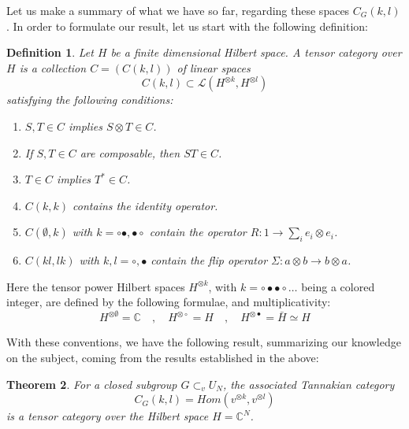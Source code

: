 \documentclass[12pt]{amsbook}
\newtheorem{theorem}{Theorem}[chapter]
\newtheorem{definition}[theorem]{Definition}
\begin{document}
Let us make a summary of what we have so far, regarding these spaces $C_G(k,l)$. In order to formulate our result, let us start with the following definition:


\begin{definition}
Let $H$ be a finite dimensional Hilbert space. A tensor category over $H$ is a collection $C=(C(k,l))$ of linear spaces 
$$C(k,l)\subset\mathcal L(H^{\otimes k},H^{\otimes l})$$
satisfying the following conditions:
\begin{enumerate}
\item $S,T\in C$ implies $S\otimes T\in C$.

\item If $S,T\in C$ are composable, then $ST\in C$.

\item $T\in C$ implies $T^*\in C$.

\item $C(k,k)$ contains the identity operator.

\item $C(\emptyset,k)$ with $k=\circ\bullet,\bullet\circ$ contain the operator $R:1\to\sum_ie_i\otimes e_i$.

\item $C(kl,lk)$ with $k,l=\circ,\bullet$ contain the flip operator $\Sigma:a\otimes b\to b\otimes a$.
\end{enumerate}
\end{definition}

Here the tensor power Hilbert spaces $H^{\otimes k}$, with $k=\circ\bullet\bullet\circ\ldots$ being a colored integer, are defined by the following formulae, and multiplicativity:
$$H^{\otimes\emptyset}=\mathbb C\quad,\quad
H^{\otimes\circ}=H\quad,\quad
H^{\otimes\bullet}=\bar{H}\simeq H$$

With these conventions, we have the following result, summarizing our knowledge on the subject, coming from the results established in the above:

\begin{theorem}
For a closed subgroup $G\subset_vU_N$, the associated Tannakian category
$$C_G(k,l)=Hom(v^{\otimes k},v^{\otimes l})$$
is a tensor category over the Hilbert space $H=\mathbb C^N$.
\end{theorem}
\end{document}
